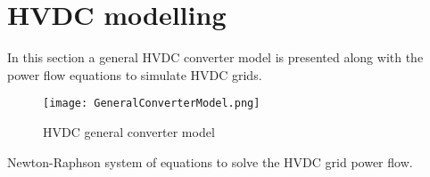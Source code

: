 \documentclass[11pt,fleqn]{book} %
\begin{document}

\pagestyle{empty} %

\renewcommand\contentsname{Table of content}
\tableofcontents%


\pagestyle{fancy} %



\chapter{HVDC modelling}

In this section a general HVDC converter model is presented along with the power flow equations to simulate HVDC grids.

\begin{figure}[h]
	\centering
	\texttt{[image: GeneralConverterModel.png]}
	\caption{HVDC general converter model}
	\label{fig:GeneralHVDCConverterModel}
\end{figure}

Newton-Raphson system of equations to solve the HVDC grid power flow.
\end{document}
